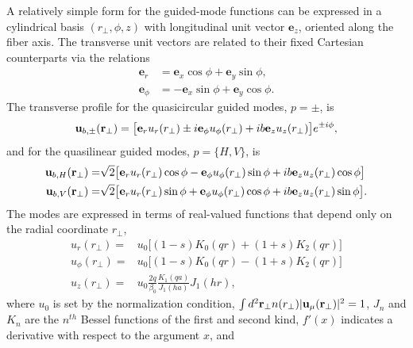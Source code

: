 \documentclass[preprint, aps,pra,onecolumn]{revtex4-1} %
\begin{document}
\begin{appendix}
A relatively simple form for the guided-mode functions can be expressed in a cylindrical basis $(r_\perp, \phi, z)$ with longitudinal unit vector $\mathbf{e}_z$, oriented along the fiber axis.  
The transverse unit vectors are related to their fixed Cartesian counterparts via the relations
	\begin{align}
		\mathbf{e}_r     &= \mathbf{e}_x \cos \phi + \mathbf{e}_y \sin \phi, \\
		\mathbf{e}_\phi &= - \mathbf{e}_x \sin \phi + \mathbf{e}_y \cos \phi.
	\end{align}
The transverse profile for the quasicircular guided modes, $p = \pm$, is
	\begin{align} \label{Eq::QuasicircularModes}
		\mathbf{u}_{b,\pm}(\mathbf{r}_\perp) = \big[\mathbf{e}_r u_r(r_\perp) \pm i \mathbf{e}_\phi u_\phi(r_\perp) +  i b \mathbf{e}_z  u_z(r_\perp) \big]e^{ \pm i \phi}, 
	\end{align}
and for the quasilinear guided modes, $p = \{H,V\}$, is
	\begin{subequations} \label{Eq::QuasilinearModes}
	\begin{align}
		\mathbf{u}_{b,H}(\mathbf{r}_\perp) = & \sqrt{2} \big[ \mathbf{e}_r u_r(r_\perp) \cos \phi - \mathbf{e}_\phi u_\phi(r_\perp) \sin \phi +  ib \mathbf{e}_z  u_z(r_\perp) \cos \phi \big] \\
		\mathbf{u}_{b,V}(\mathbf{r}_\perp) = & \sqrt{2} \big[ \mathbf{e}_r u_r(r_\perp) \sin \phi + \mathbf{e}_\phi u_\phi(r_\perp) \cos \phi +  ib \mathbf{e}_z  u_z(r_\perp) \sin \phi \big]. 
	\end{align}
	\end{subequations}
The modes are expressed in terms of real-valued functions that depend only on the radial coordinate $r_\perp$,
	\begin{subequations} \label{Eq::ProfileFunctions}
	\begin{align} 
		u_r(r_\perp) =& u_0 \big[ (1-s) K_0(qr) + (1+s)K_2(qr)\big] \\
		u_\phi(r_\perp) =& u_0\big[ (1-s) K_0(qr) - (1+s)K_2(qr)\big] \\
		u_z(r_\perp) =& u_0 \frac{2 q}{\beta_0} \frac{K_1(qa)}{J_1(ha)} J_1(hr), \label{Eq::zprofile}
	\end{align}
	\end{subequations}
where $u_0$ is set by the normalization condition, $\int d^2 \mathbf{r}_\perp n(r_\perp) | \mathbf{u}_\mu(\mathbf{r}_\perp)|^2=1$, $J_n$ and $K_n$ are the $n^{th}$ Bessel functions of the first and second kind, $f'(x)$ indicates a derivative with respect to the argument $x$, and 

\end{appendix}
\end{document}
